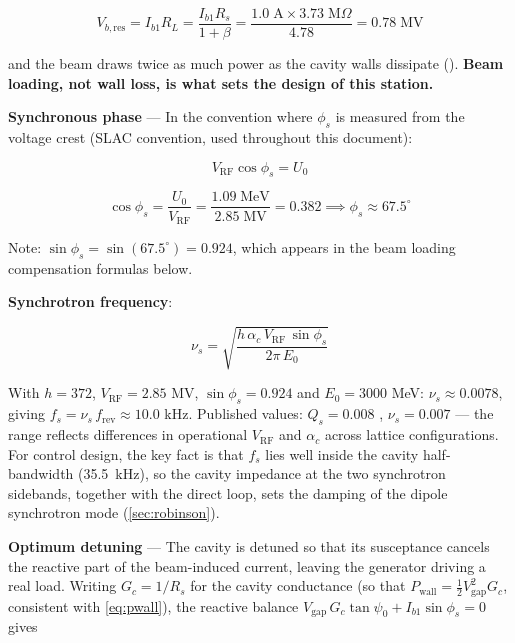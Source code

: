 \begin{equation}\label{eq:vb-res}
V_{b,\text{res}} = I_{b1} R_L = \frac{I_{b1} R_s}{1+\beta} = \frac{1.0\;\text{A} \times 3.73\;\text{M}\Omega}{4.78} = 0.78\;\text{MV}
\end{equation}

and the beam draws twice as much power as the cavity walls dissipate (). \textbf{Beam loading, not wall loss, is what sets the design of this station.}

\textbf{Synchronous phase} --- In the convention where \(\phi_s\) is measured from the voltage crest (SLAC convention, used throughout this document):

\begin{equation}\label{eq:phis}
V_\text{RF} \cos\phi_s = U_0
\end{equation}

\begin{equation}\label{eq:phis-eval}
\cos\phi_s = \frac{U_0}{V_\text{RF}} = \frac{1.09\;\text{MeV}}{2.85\;\text{MV}} = 0.382 \implies \phi_s \approx 67.5^\circ
\end{equation}

Note: \(\sin\phi_s = \sin(67.5^\circ) = 0.924\), which appears in the beam loading compensation formulas below.

\textbf{Synchrotron frequency}:

\begin{equation}\label{eq:nus}
\nu_s = \sqrt{\frac{h\,\alpha_c\,V_\text{RF}\,\sin\phi_s}{2\pi\,E_0}}
\end{equation}

\begin{keynote}
With \(h = 372\), \(V_\text{RF} = 2.85\) MV, \(\sin\phi_s = 0.924\) and \(E_0 = 3000\) MeV: \(\nu_s \approx 0.0078\), giving \(f_s = \nu_s \, f_\text{rev} \approx 10.0\) kHz. Published values: \(Q_s = 0.008\) , \(\nu_s = 0.007\)  --- the range reflects differences in operational \(V_\text{RF}\) and \(\alpha_c\) across lattice configurations. For control design, the key fact is that \(f_s\) lies well inside the cavity half-bandwidth (\qty{35.5}{\kilo\hertz}), so the cavity impedance at the two synchrotron sidebands, together with the direct loop, sets the damping of the dipole synchrotron mode (\cref{sec:robinson}).
\end{keynote}

\textbf{Optimum detuning} --- The cavity is detuned so that its susceptance cancels the reactive part of the beam-induced current, leaving the generator driving a real load. Writing \(G_c = 1/R_s\) for the cavity conductance (so that \(P_\text{wall} = \tfrac{1}{2}V_\text{gap}^2 G_c\), consistent with \cref{eq:pwall}), the reactive balance \(V_\text{gap}\,G_c\tan\psi_0 + I_{b1}\sin\phi_s = 0\) gives

